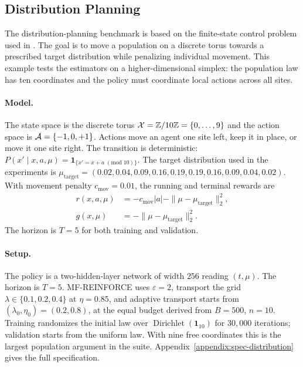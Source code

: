 \subsection{Distribution Planning}
\label{subsec:distribution-planning}

The distribution-planning benchmark is based on the finite-state control problem used in \cite{meunier2026model,carmona2023model}. The goal is to move a population on a discrete torus towards a prescribed target distribution while penalizing individual movement. This example tests the estimators on a higher-dimensional simplex: the population law has ten coordinates and the policy must coordinate local actions across all sites.

\paragraph{Model.}
The state space is the discrete torus ${\cal X}=\mathbb{Z}/10\mathbb{Z}=\{0,\ldots,9\}$ and the action space is ${\cal A}=\{-1,0,+1\}$. Actions move an agent one site left, keep it in place, or move it one site right. The transition is deterministic: $P(x'\mid x,a,\mu) = \mathbf 1_{\{x'=x+a\;(\mathrm{mod}\;10)\}}$.
The target distribution used in the experiments is $\mu_{\mathrm{target}} = (0.02,0.04,0.09,0.16,0.19,0.19,0.16,0.09,0.04,0.02)$.
With movement penalty $c_{\mathrm{mov}}=0.01$, the running and terminal rewards are
\begin{align}
    r(x,a,\mu)
    &=
    -c_{\mathrm{mov}}|a|
    -
    \|\mu-\mu_{\mathrm{target}}\|_2^2,
    \\
    g(x,\mu)
    &=
    -\|\mu-\mu_{\mathrm{target}}\|_2^2.
\end{align}
The horizon is $T=5$ for both training and validation.

\paragraph{Setup.}
The policy is a two-hidden-layer network of width $256$ reading $(t,\mu)$. The horizon is $T=5$. MF-REINFORCE uses $\varepsilon=2$, transport the grid $\lambda\in\{0.1,0.2,0.4\}$ at $\eta=0.85$, and adaptive transport starts from $(\lambda_0,\eta_0)=(0.2,0.8)$, at the equal budget derived from $B=500$, $n=10$. Training randomizes the initial law over $\operatorname{Dirichlet}(\mathbf 1_{10})$ for $30{,}000$ iterations; validation starts from the uniform law. With nine free coordinates this is the largest population argument in the suite. Appendix~\ref{appendix:spec-distribution} gives the full specification.

